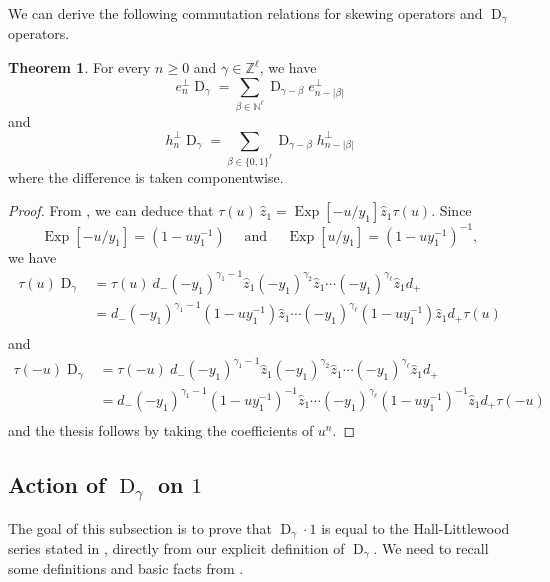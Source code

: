 \documentclass[reqno]{amsart}
\theoremstyle{plain}
\theoremstyle{definition}
\newtheorem{theorem}{Theorem}[section]
\theoremstyle{remark}
\DeclareMathOperator{\D}{D}
\DeclareMathOperator{\Exp}{Exp}
\newcommand{\z}{\widehat{z}}
\newcommand{\<}{\langle}
\renewcommand{\>}{\rangle}
\begin{document}
We can derive the following commutation relations for skewing operators and $\D_\gamma$ operators.

\begin{theorem}
    For every $n \geq 0$ and $\gamma\in \mathbb{Z}^\ell$, we have
    \begin{equation}
        e_n^\perp \D_\gamma = \sum_{\beta \in \mathbb{N}^\ell} \D_{\gamma-\beta} e_{n-\lvert \beta \rvert}^\perp
    \end{equation}
    and
    \begin{equation}
        h_n^\perp \D_\gamma = \sum_{\beta \in \{0,1\}^\ell} \D_{\gamma-\beta} h_{n-\lvert \beta \rvert}^\perp
    \end{equation}
    where the difference is taken componentwise.
\end{theorem}

\begin{proof}
    From , we can deduce that $\tau(u)\ \z_1 = \Exp[-u/y_1] \z_1 \tau(u)$. Since
    \[ \Exp[-u/y_1] = (1 - u y_1^{-1}) \quad \text{ and } \quad \Exp[u/y_1] = (1 - u y_1^{-1})^{-1}, \]
    we have
    \begin{align*}
        \tau(u) \D_\gamma & = \tau(u)\ d_- (-y_1)^{\gamma_{1}-1} \z_1 (-y_1)^{\gamma_{2}} \z_1 \cdots (-y_1)^{\gamma_{\ell}} \z_1 d_+ \\
        & = d_- (-y_1)^{\gamma_{1}-1} (1 - uy_1^{-1}) \z_1 \cdots (-y_1)^{\gamma_{\ell}} (1 - uy_1^{-1}) \z_1 d_+ \tau(u) \\
    \end{align*}
    and
    \begin{align*}
        \tau(-u) \D_\gamma & = \tau(-u)\ d_- (-y_1)^{\gamma_{1}-1} \z_1 (-y_1)^{\gamma_{2}} \z_1 \cdots (-y_1)^{\gamma_{\ell}} \z_1 d_+ \\
        & = d_- (-y_1)^{\gamma_{1}-1} (1 - uy_1^{-1})^{-1} \z_1 \cdots (-y_1)^{\gamma_{\ell}} (1 - uy_1^{-1})^{-1} \z_1 d_+ \tau(-u) \\
    \end{align*}
    and the thesis follows by taking the coefficients of $u^n$.
\end{proof}


\subsection{Action of \texorpdfstring{$\D_\gamma$}{Dgamma} on \texorpdfstring{$1$}{1}}
\label{section:Dgammaon1}

The goal of this subsection is to prove that $\D_\gamma \cdot 1$ is equal to the Hall-Littlewood series stated in \cite[Corollary~3.7.2]{BHMPS2023ShuffleAnyLine}, directly from our explicit definition of $\D_\gamma$. We need to recall some definitions and basic facts from \cite[Section~2]{BHMPS2023ShuffleAnyLine}.
\end{document}
